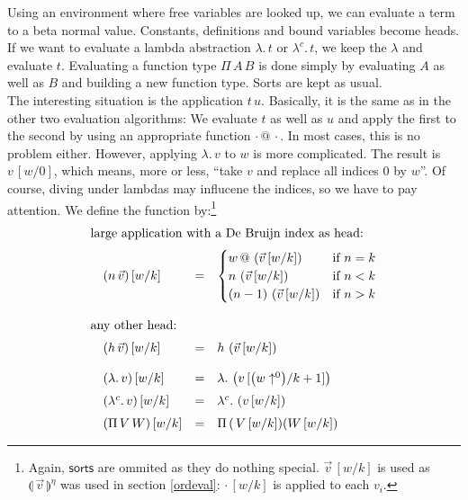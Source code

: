 \documentclass[12pt, a4paper, titlepage]{article}
\makeatletter
\newcommand{\sspace}{\,}
\newcommand{\la}{\lambda}
\newcommand{\emphSec}[1]{#1}
\newcommand{\LaH}[1]{\la . \sspace #1}
\newcommand{\KH}[1]{\la^c . \sspace #1}
\newcommand{\ApH}[2]{#1 \sspace #2}
\newcommand{\PiH}[2]{\Pi \sspace #1 \sspace #2}
\newcommand{\LaVH}[1]{\LaH #1} %
\newcommand{\KVH}[1]{\KH #1} %
\newcommand{\FunH}[2]{\PiH #1 #2}
\newcommand{\hersub}[3]{{#1}\,[{#3}/{#2}]}
\newcommand{\lift}[2]{ #2 \uparrow^{#1}}
\newcommand{\ap}{\,@\,}
\newcommand{\valsub}[2]{\llparenthesis {\,#1\,} \rrparenthesis^{#2}}
\makeatother
\begin{document}
Using an environment where \emphSec{free variables} are looked up, we can evaluate a term to a beta normal value. \emphSec{Constants}, \emphSec{definitions} and \emphSec{bound variables} become \emphSec{heads}. If we want to evaluate a \emphSec{lambda abstraction} $\LaH t$ or $\KH t$, we keep the $\la$ and evaluate $t$. Evaluating a \emphSec{function type} $\PiH A B$ is done simply by evaluating $A$ as well as $B$ and building a new \emphSec{function type}. \emphSec{Sorts} are kept as usual. 
\\
The interesting situation is the \emphSec{application} $\ApH t u$. Basically, it is the same as in the other two evaluation algorithms: We evaluate $t$ as well as $u$ and apply the first to the second by using an appropriate function $\cdot \ap \cdot$. In most cases, this is no problem either. However, applying $\LaVH{v}$ to $w$ is more complicated. The result is $\hersub{v}{0}{w}$, which means, more or less, ``take $v$ and replace all indices $0$ by $w$''. Of course, diving under lambdas may influcene the indices, so we have to pay attention. We define the function by:\footnote{Again, $\mathsf{sorts}$ are ommited as they do nothing special. 
$\hersub{\vec v}{k}{w}$ is used as $\valsub{\vec v}{\eta}$ was used in section \ref{ordeval}: $\hersub{\cdot}{k}{w}$ is applied to each $v_i$.
}
\[ 
\begin{array}{llll}
\multicolumn{4}{l}{\text{large application with a De Bruijn index as head:}}
\\
\noalign{\medskip}
& \hersub{\left( n \sspace \vec v \right) }{k}{w} & = &  
\begin{cases}
 w \ap \left( \hersub{\vec v}{k}{w} \right) & \text{if $n = k$} \\
 n \sspace \left(\hersub {\vec v} k w\right) & \text{if $n < k$} \\
 (n-1) \sspace \left(\hersub {\vec v} k w\right) & \text{if $n > k$} \\
\end{cases}\\
\\
\multicolumn{4}{l}{\text{any other head:}} \\
\noalign{\medskip}
& \hersub{ \left( h \sspace \vec v \right) }{k}{w} & = & h \sspace \left(\hersub {\vec v} k w\right) \\
\\
& \hersub{ \left( \LaVH v \right) }{k}{w} & = & \LaVH{ \left(\hersub{v}{k+1}{\left( \lift 0 w \right)}\right)}
\\
\noalign{\medskip}
& \hersub{ \left( \KVH v \right) }{k}{w} & = & \KVH{ \left(\hersub{v}{k}{w}\right)} 
\\
\noalign{\medskip}
& \hersub{ \left( \FunH V W \right) }{k}{w}  & = & \FunH { ( \hersub{V}{k}{w} ) } { ( \hersub{W}{k}{w} ) }
\end{array}
\]
\end{document}
